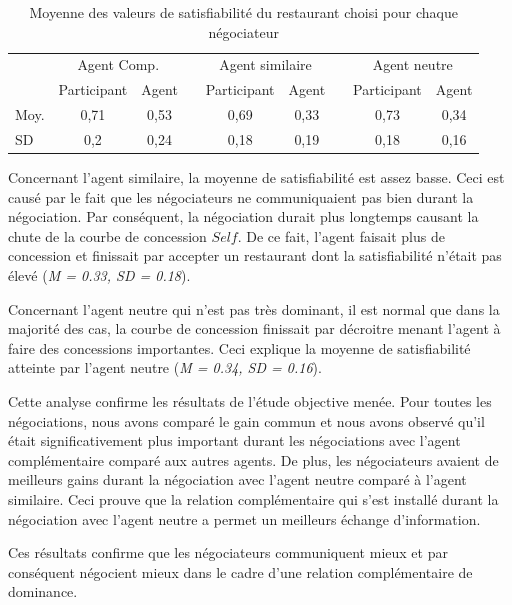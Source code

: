 	
	\begin{table}
		\centering
		\caption{Moyenne des valeurs de satisfiabilité du restaurant choisi pour chaque négociateur} 
		\begin{tabular} {lcccccccc}
			\hline
			& \multicolumn{2}{c}{Agent Comp.} & & \multicolumn{2}{c}{Agent similaire}& & \multicolumn{2}{c}{Agent neutre} \\ %
			\cline{2-3} \cline{5-6} \cline{8-9} %
			& Participant & Agent & & Participant & Agent & &  Participant & Agent \\ \hline
			Moy. &0,71 & 0,53 & &  0,69 & 0,33 & & 0,73 & 0,34 \\
			SD & 0,2 & 0,24 & &  0,18 & 0,19 & & 0,18 & 0,16 \\
			\hline
		\end{tabular}
		\label{tab:gainPerceptif}
		
	\end{table}
	
	Concernant l'agent similaire, la moyenne de satisfiabilité est assez basse. Ceci est causé par le fait que les négociateurs ne communiquaient pas bien durant la négociation. Par conséquent, la négociation durait plus longtemps causant la chute de la courbe de concession $Self$. De ce fait, l'agent faisait plus de concession et finissait par accepter un restaurant dont la satisfiabilité n'était pas élevé (\emph{M = 0.33, SD = 0.18}).
	
	Concernant l'agent neutre qui n'est pas très dominant, il est normal que dans la majorité des cas, la courbe de concession finissait par décroitre menant l'agent à faire des concessions importantes. Ceci explique la moyenne de satisfiabilité atteinte par l'agent neutre  (\emph{M = 0.34, SD = 0.16}).
	
	Cette analyse confirme les résultats de l'étude objective menée.
	Pour toutes les négociations, nous avons comparé le gain commun et nous avons observé qu'il était significativement plus important durant les négociations avec l'agent complémentaire comparé aux autres agents. De plus, les négociateurs avaient de meilleurs gains durant la négociation avec l'agent neutre comparé à l'agent similaire. Ceci prouve que la relation complémentaire qui s'est installé durant la négociation avec l'agent neutre a permet un meilleurs échange d'information. 
	
	Ces résultats confirme que les négociateurs communiquent mieux et par conséquent négocient mieux dans le cadre d'une relation complémentaire de dominance.  
	
